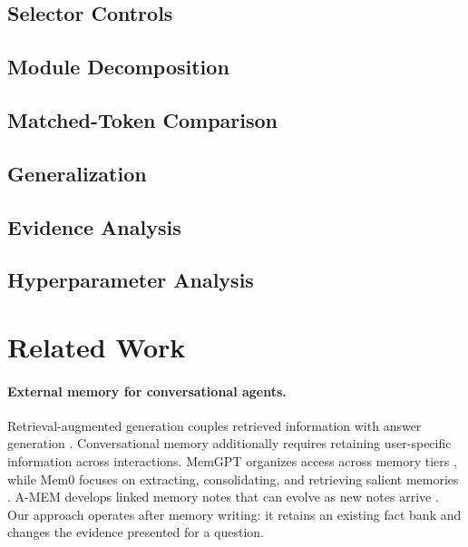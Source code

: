 \documentclass[11pt]{article}
\begin{document}
\subsection{Selector Controls}
\label{sec:selector-controls}

\subsection{Module Decomposition}
\label{sec:module-decomposition}

\subsection{Matched-Token Comparison}
\label{sec:token-control}

\subsection{Generalization}
\label{sec:generalization}

\subsection{Evidence Analysis}
\label{sec:evidence-analysis}

\subsection{Hyperparameter Analysis}
\label{sec:hyperparameters}

\section{Related Work}
\paragraph{External memory for conversational agents.}
Retrieval-augmented generation couples retrieved information with answer generation \citep{lewis2020rag}. Conversational memory additionally requires retaining user-specific information across interactions. MemGPT organizes access across memory tiers \citep{packer2023memgpt}, while Mem0 focuses on extracting, consolidating, and retrieving salient memories \citep{chhikara2025mem0}. A-MEM develops linked memory notes that can evolve as new notes arrive \citep{xu2025amem}. Our approach operates after memory writing: it retains an existing fact bank and changes the evidence presented for a question.
\end{document}
